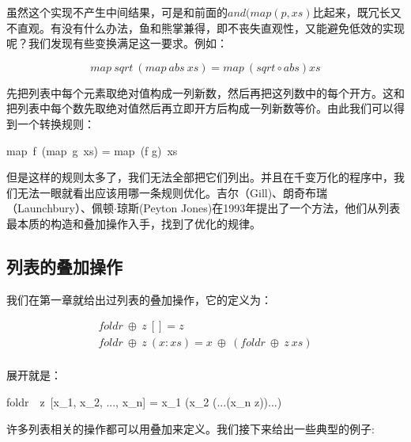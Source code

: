 \documentclass{article}
\begin{document}
虽然这个实现不产生中间结果，可是和前面的$and(map(p, xs)$比起来，既冗长又不直观。有没有什么办法，鱼和熊掌兼得，即不丧失直观性，又能避免低效的实现呢？我们发现有些变换满足这一要求。例如：

\[
map\ sqrt\  (map\ abs\ xs) = map\ (sqrt \circ abs) xs
\]

先把列表中每个元素取绝对值构成一列新数，然后再把这列数中的每个开方。这和把列表中每个数先取绝对值然后再立即开方后构成一列新数等价。由此我们可以得到一个转换规则：

\be
map\ f\ (map\ g\ xs) = map\ (f \circ g)\ xs
\ee

但是这样的规则太多了，我们无法全部把它们列出。并且在千变万化的程序中，我们无法一眼就看出应该用哪一条规则优化。吉尔（Gill)、朗奇布瑞（Launchbury）、佩顿$\cdot$琼斯(Peyton Jones)在1993年提出了一个方法，他们从列表最本质的构造和叠加操作入手，找到了优化的规律。

\subsection{列表的叠加操作}

我们在第一章就给出过列表的叠加操作，它的定义为：

\[
\begin{array}{l}
foldr\ \oplus\ z\ [] = z \\
foldr\ \oplus\ z\ (x:xs) = x\ \oplus\ (foldr\ \oplus\ z\ xs) \\
\end{array}
\]

展开就是：

\be
foldr\ \oplus\ z\ [x_1, x_2, ..., x_n] = x_1 \oplus (x_2 \oplus (...(x_n \oplus z))...)
\ee

许多列表相关的操作都可以用叠加来定义。我们接下来给出一些典型的例子:
\end{document}
